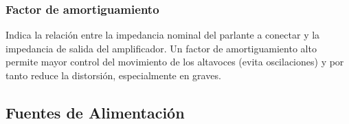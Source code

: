 \subsubsection*{Factor de amortiguamiento}

Indica la relación entre la impedancia nominal del parlante a conectar y la impedancia de salida del amplificador. Un factor de amortiguamiento alto permite mayor control del movimiento de los 
altavoces (evita oscilaciones) y por tanto reduce la distorsión, especialmente en graves. 

\subsection{Fuentes de Alimentación}


%	
